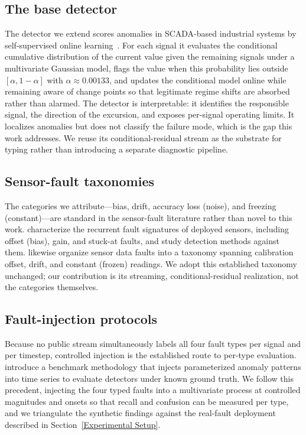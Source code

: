 \subsection{The base detector}
The detector we extend scores anomalies in SCADA-based industrial systems by self-supervised online learning~\citep{Wadinger2023}. For each signal it evaluates the conditional cumulative distribution of the current value given the remaining signals under a multivariate Gaussian model, flags the value when this probability lies outside $[\alpha, 1-\alpha]$ with $\alpha \approx 0.00133$, and updates the conditional model online while remaining aware of change points so that legitimate regime shifts are absorbed rather than alarmed. The detector is interpretable: it identifies the responsible signal, the direction of the excursion, and exposes per-signal operating limits. It localizes anomalies but does not classify the failure mode, which is the gap this work addresses. We reuse its conditional-residual stream as the substrate for typing rather than introducing a separate diagnostic pipeline.

\subsection{Sensor-fault taxonomies}
The categories we attribute---bias, drift, accuracy loss (noise), and freezing (constant)---are standard in the sensor-fault literature rather than novel to this work. \citet{Sharma2010} characterize the recurrent fault signatures of deployed sensors, including offset (bias), gain, and stuck-at faults, and study detection methods against them. \citet{Ni2009} likewise organize sensor data faults into a taxonomy spanning calibration offset, drift, and constant (frozen) readings. We adopt this established taxonomy unchanged; our contribution is its streaming, conditional-residual realization, not the categories themselves.

\subsection{Fault-injection protocols}
Because no public stream simultaneously labels all four fault types per signal and per timestep, controlled injection is the established route to per-type evaluation. \citet{Lai2021} introduce a benchmark methodology that injects parameterized anomaly patterns into time series to evaluate detectors under known ground truth. We follow this precedent, injecting the four typed faults into a multivariate process at controlled magnitudes and onsets so that recall and confusion can be measured per type, and we triangulate the synthetic findings against the real-fault deployment described in Section~\ref{Experimental Setup}.

